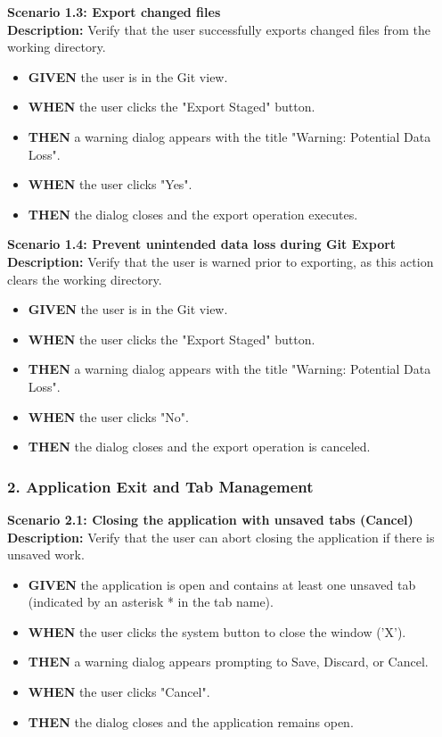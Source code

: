 \documentclass[12pt, a4paper]{article}
\begin{document}
\textbf{Scenario 1.3: Export changed files} \\
\textbf{Description:} Verify that the user successfully exports changed files from the working directory.
\begin{itemize}
    \item \textbf{GIVEN} the user is in the Git view.
    \item \textbf{WHEN} the user clicks the "Export Staged" button.
    \item \textbf{THEN} a warning dialog appears with the title "Warning: Potential Data Loss".
    \item \textbf{WHEN} the user clicks "Yes".
    \item \textbf{THEN} the dialog closes and the export operation executes.
\end{itemize}

\textbf{Scenario 1.4: Prevent unintended data loss during Git Export} \\
\textbf{Description:} Verify that the user is warned prior to exporting, as this action clears the working directory.
\begin{itemize}
    \item \textbf{GIVEN} the user is in the Git view.
    \item \textbf{WHEN} the user clicks the "Export Staged" button.
    \item \textbf{THEN} a warning dialog appears with the title "Warning: Potential Data Loss".
    \item \textbf{WHEN} the user clicks "No".
    \item \textbf{THEN} the dialog closes and the export operation is canceled.
\end{itemize}

\subsubsection*{2. Application Exit and Tab Management}

\textbf{Scenario 2.1: Closing the application with unsaved tabs (Cancel)} \\
\textbf{Description:} Verify that the user can abort closing the application if there is unsaved work.
\begin{itemize}
    \item \textbf{GIVEN} the application is open and contains at least one unsaved tab (indicated by an asterisk * in the tab name).
    \item \textbf{WHEN} the user clicks the system button to close the window ('X').
    \item \textbf{THEN} a warning dialog appears prompting to Save, Discard, or Cancel.
    \item \textbf{WHEN} the user clicks "Cancel".
    \item \textbf{THEN} the dialog closes and the application remains open.
\end{itemize}
\end{document}
